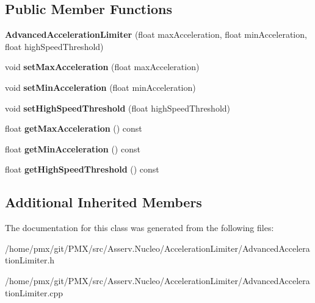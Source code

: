 \subsection*{Public Member Functions}
\begin{DoxyCompactItemize}
\item 
\mbox{\label{classAdvancedAccelerationLimiter_a39a75de68469a4d508749a58e42dfe8d}} 
{\bfseries Advanced\+Acceleration\+Limiter} (float max\+Acceleration, float min\+Acceleration, float high\+Speed\+Threshold)
\item 
\mbox{\label{classAdvancedAccelerationLimiter_ad3a422015d6da444691a4dec0b6c0875}} 
void {\bfseries set\+Max\+Acceleration} (float max\+Acceleration)
\item 
\mbox{\label{classAdvancedAccelerationLimiter_a04d51d1bfca989e09658f849d8536e8f}} 
void {\bfseries set\+Min\+Acceleration} (float min\+Acceleration)
\item 
\mbox{\label{classAdvancedAccelerationLimiter_ab5ccbab0985f9bdb397752b3eda9d92f}} 
void {\bfseries set\+High\+Speed\+Threshold} (float high\+Speed\+Threshold)
\item 
\mbox{\label{classAdvancedAccelerationLimiter_a218568908db5d85131c2566b1838317e}} 
float {\bfseries get\+Max\+Acceleration} () const
\item 
\mbox{\label{classAdvancedAccelerationLimiter_a552870d1eeeca1ee84ca3386ef0192c8}} 
float {\bfseries get\+Min\+Acceleration} () const
\item 
\mbox{\label{classAdvancedAccelerationLimiter_a453710d95139c159c5c83f2b5f6fb4ba}} 
float {\bfseries get\+High\+Speed\+Threshold} () const
\end{DoxyCompactItemize}
\subsection*{Additional Inherited Members}


The documentation for this class was generated from the following files\+:\begin{DoxyCompactItemize}
\item 
/home/pmx/git/\+P\+M\+X/src/\+Asserv.\+Nucleo/\+Acceleration\+Limiter/Advanced\+Acceleration\+Limiter.\+h\item 
/home/pmx/git/\+P\+M\+X/src/\+Asserv.\+Nucleo/\+Acceleration\+Limiter/Advanced\+Acceleration\+Limiter.\+cpp\end{DoxyCompactItemize}

